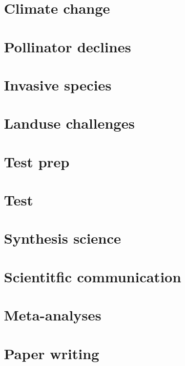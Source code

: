 \documentclass[
]{book}
\begin{document}
\hypertarget{climate}{%
\chapter{Climate change}\label{climate}}

\hypertarget{pollinators}{%
\chapter{Pollinator declines}\label{pollinators}}

\hypertarget{invasions}{%
\chapter{Invasive species}\label{invasions}}

\hypertarget{landuse}{%
\chapter{Landuse challenges}\label{landuse}}

\hypertarget{testprep}{%
\chapter{Test prep}\label{testprep}}

\hypertarget{test}{%
\chapter{Test}\label{test}}

\hypertarget{synthesis}{%
\chapter{Synthesis science}\label{synthesis}}

\hypertarget{scicomm}{%
\chapter{Scientitfic communication}\label{scicomm}}

\hypertarget{metas}{%
\chapter{Meta-analyses}\label{metas}}

\hypertarget{papers}{%
\chapter{Paper writing}\label{papers}}

  
\end{document}
